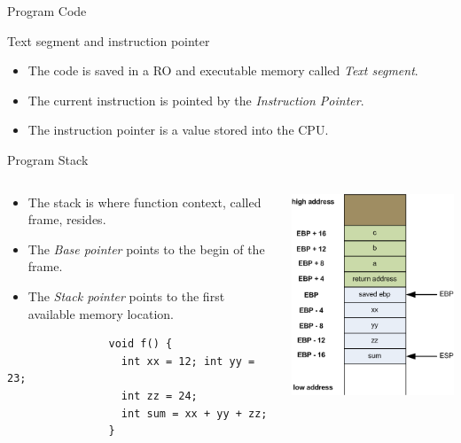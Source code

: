 \begin{frame}{Program Code}
	\begin{block}{Text segment and instruction pointer}
		\begin{itemize}
			\item The code is saved in a RO and executable memory called \emph{Text segment}.
			\item The current instruction is pointed by the \emph{Instruction Pointer}.
			\item The instruction pointer is a value stored into the CPU.
		\end{itemize}
	\end{block}
\end{frame}

\begin{frame}[fragile]{Program Stack}
	\begin{columns}[T]
		\begin{column}{.6\textwidth}
			\begin{itemize}
				\item The stack is where function context, called frame, resides.
				\item The \emph{Base pointer} points to the begin of the frame.
				\item The \emph{Stack  pointer} points to the first available memory location.
			\end{itemize}
			\ccode
			\begin{lstlisting}
				void f() {
				  int xx = 12; int yy = 23;
				  int zz = 24;
				  int sum = xx + yy + zz;
				}
			\end{lstlisting}
		\end{column}
		\begin{column}{.4\textwidth}
			\includegraphics[width=\textwidth]{imgs/stackframe1.png}

\end{column}
\end{columns}
\end{frame}
